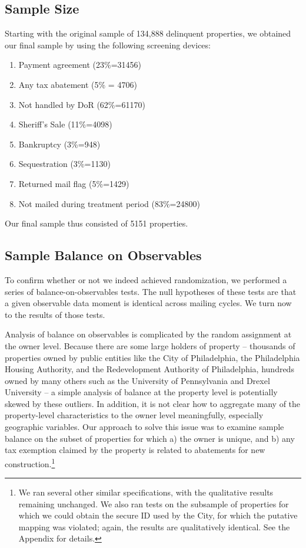 \documentclass[12pt,titlepage]{article}
\begin{document}
\subsection{Sample Size}

Starting with the original sample of 134,888 delinquent properties, we
obtained our final sample by using the following screening devices:
\begin{enumerate}
\item Payment agreement (23\%=31456)
\item Any tax abatement (5\% = 4706)
\item Not handled by DoR (62\%=61170)
\item Sheriff's Sale (11\%=4098)
\item Bankruptcy (3\%=948)
\item Sequestration (3\%=1130)
\item Returned mail flag (5\%=1429)
\item Not mailed during treatment period (83\%=24800)
\end{enumerate}
Our final sample thus consisted of 5151 properties. 


\subsection{Sample Balance on Observables}

To confirm whether or not we indeed achieved randomization, we
performed a series of balance-on-observables tests. The null
hypotheses of these tests are that a given observable data moment is
identical across mailing cycles. We turn now to the results of those
tests.

Analysis of balance on observables is complicated by the random
assignment at the owner level.  Because there are some large holders of property  -- thousands of
properties owned by public entities like the City of Philadelphia, the
Philadelphia Housing Authority, and the Redevelopment Authority of
Philadelphia, hundreds owned by many others such as the University of
Pennsylvania and Drexel University -- a simple analysis of balance at
the property level is potentially skewed by these outliers. In addition,
it is not clear how to aggregate many of the property-level
characteristics to the owner level meaningfully, especially geographic
variables. Our approach to solve this issue was to examine sample balance on the
subset of properties for which a) the owner is unique, and b) any tax exemption claimed by the property is
related to abatements for new construction.\footnote{We ran several other similar specifications, with the 
qualitative results remaining unchanged. We also ran tests on the subsample of properties for which
we could obtain the secure ID used by the City, for which the putative mapping was violated; again, the
results are qualitatively identical. See the Appendix for details.}
\end{document}

